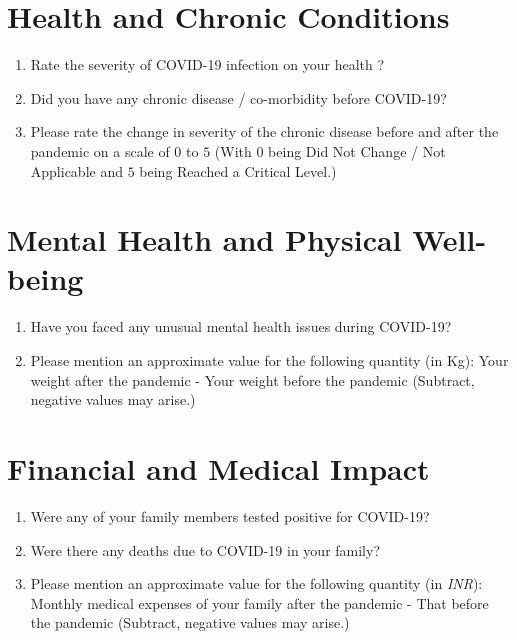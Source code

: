 \section*{Health and Chronic Conditions}
\begin{enumerate}[resume]
    \item Rate the severity of COVID-19 infection on your health ?
    \item Did you have any chronic disease / co-morbidity before COVID-19?
    \item Please rate the change in severity of the chronic disease before and after the pandemic on a scale of $0$ to $5$ (With $0$ being Did Not Change / Not Applicable and $5$ being Reached a Critical Level.)
\end{enumerate}

\section*{Mental Health and Physical Well-being}
\begin{enumerate}[resume]
    \item Have you faced any unusual mental health issues during COVID-19?
    \item Please mention an approximate value for the following quantity (in Kg): Your weight after the pandemic - Your weight before the pandemic (Subtract, negative values may arise.)
\end{enumerate}

\section*{Financial and Medical Impact}
\begin{enumerate}[resume]
    \item Were any of your family members tested positive for COVID-19?
    \item Were there any deaths due to COVID-19 in your family?
    \item Please mention an approximate value for the following quantity (in \textit{INR}): Monthly medical expenses of your family after the pandemic - That before the pandemic (Subtract, negative values may arise.)
\end{enumerate}

